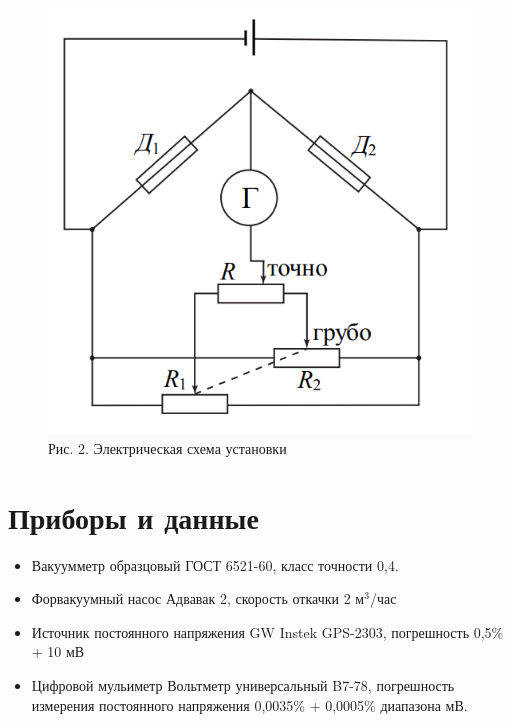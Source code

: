 \documentclass[a4paper]{article}
\begin{document}
\begin{figure}[h!]
\begin{minipage}{0.48\textwidth}
        \centering
        \includegraphics[width=\linewidth]{scheme.png}
        \caption{Рис. 2. Электрическая схема установки}
        \label{fig:scheme}
    \end{minipage}
\end{figure}

\section{Приборы и данные}
\begin{itemize}
    \item Вакуумметр образцовый ГОСТ 6521-60, класс точности 0,4.
    \item Форвакуумный насос Адвавак 2, скорость откачки 2 м$^3$/час
	\item Источник постоянного напряжения GW Instek GPS-2303, погрешность 0,5\% + 10 мВ
	\item Цифровой мульиметр Вольтметр универсальный B7-78, погрешность измерения постоянного напряжения 0,0035\% + 0,0005\% диапазона мВ. 
\end{itemize}
\end{document}
